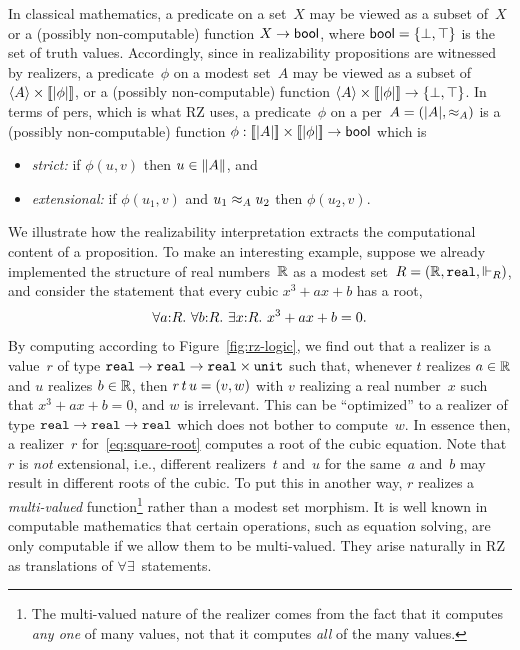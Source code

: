 In classical mathematics, a predicate on a set~$X$ may be viewed as a
subset of~$X$ or a (possibly non-computable) function $X \to \mathsf{bool}$,
where $\mathsf{bool} = \{\bot, \top\}$ is the set of truth values.
Accordingly, since in realizability propositions are witnessed by
realizers, a predicate~$\phi$ on a modest set~$A$ may be viewed as a
subset of $\langle A \rangle \times [\![|\phi|]\!]$, or a (possibly
non-computable) function $\langle A \rangle \times [\![|\phi|]\!] \to
\{\bot, \top\}$. In terms of pers, which is what RZ uses, a
predicate~$\phi$ on a per~$A = (|A|, {\approx_A})$ is a (possibly
non-computable) function $\phi : [\![|A|]\!] \times
[\![|\phi|]\!] \to \mathsf{bool}$ which is
%
\begin{itemize}
\item \emph{strict:} if $\phi(u,v)$ then $u \in \|A\|$, and
\item \emph{extensional:} if $\phi(u_1,v)$ and $u_1 \approx_A u_2$ then
  $\phi(u_2,v)$.
\end{itemize}

We illustrate how the realizability interpretation extracts the
computational content of a proposition. To make an interesting
example, suppose we already implemented the structure of real
numbers~$\mathbb{R}$ as a modest set~$R = (\mathbb{R}, \mathtt{real}, {\Vdash_R})$, and
consider the statement that every cubic $x^3 + a x + b$ has a root,
%
\begin{equation}
  \label{eq:square-root}%
  \iforall{a}{R}{\iforall{b}{R}{\iexists{x}{R}{\iequal{x^3 + a x + b}{0}}}}.
\end{equation}
%
By computing according to Figure~\ref{fig:rz-logic}, we find out that
a realizer is a value~$r$ of type
$\mathtt{real} \to \mathtt{real} \to \mathtt{real} \times \mathtt{unit}$
such that, whenever $t$ realizes $a \in \mathbb{R}$ and $u$ realizes $b \in
\mathbb{R}$, then $r\,t\,u = (v, w)$ with $v$ realizing a real
number~$x$ such that $x^3 + a x + b = 0$, and $w$ is irrelevant. This
can be ``optimized'' to a realizer of type
$\mathtt{real} \to \mathtt{real} \to \mathtt{real}$ which
does not bother to compute~$w$. In essence then, a realizer~$r$
for~\eqref{eq:square-root} computes a root of the cubic equation. Note
that $r$ is \emph{not} extensional, i.e., different realizers~$t$
and~$u$ for the same~$a$ and~$b$ may result in different roots of the
cubic. To put this in another way, $r$ realizes a \emph{multi-valued}
function\footnote{The multi-valued nature of the realizer comes from
  the fact that it computes \emph{any one} of many values, not that it
  computes \emph{all} of the many values.} rather than a modest set
morphism. It is well known in computable mathematics that certain
operations, such as equation solving, are only computable if we allow
them to be multi-valued. They arise naturally in RZ as translations of
$\forall\exists$~statements.

